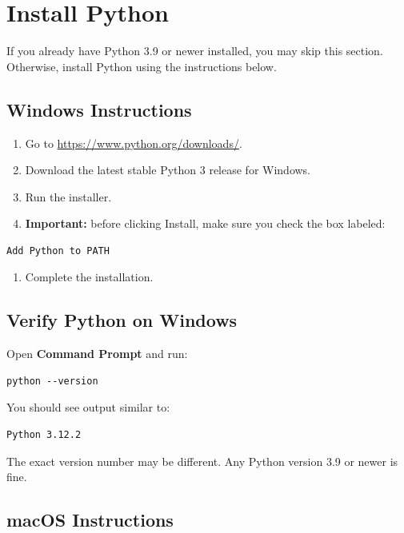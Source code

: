\documentclass[11pt]{article}
\begin{document}
\section{Install Python}

If you already have Python 3.9 or newer installed, you may skip this section. Otherwise, install Python using the instructions below.

\subsection*{Windows Instructions}

\begin{enumerate}
    \item Go to \url{https://www.python.org/downloads/}.
    \item Download the latest stable Python 3 release for Windows.
    \item Run the installer.
    \item \textbf{Important:} before clicking Install, make sure you check the box labeled:
\end{enumerate}

\begin{lstlisting}[style=terminal]
Add Python to PATH
\end{lstlisting}

\begin{enumerate}[resume]
    \item Complete the installation.
\end{enumerate}

\subsection*{Verify Python on Windows}

Open \textbf{Command Prompt} and run:

\begin{lstlisting}[style=terminal]
python --version
\end{lstlisting}

You should see output similar to:

\begin{lstlisting}[style=terminal]
Python 3.12.2
\end{lstlisting}

The exact version number may be different. Any Python version 3.9 or newer is fine.

\subsection*{macOS Instructions}
\end{document}
